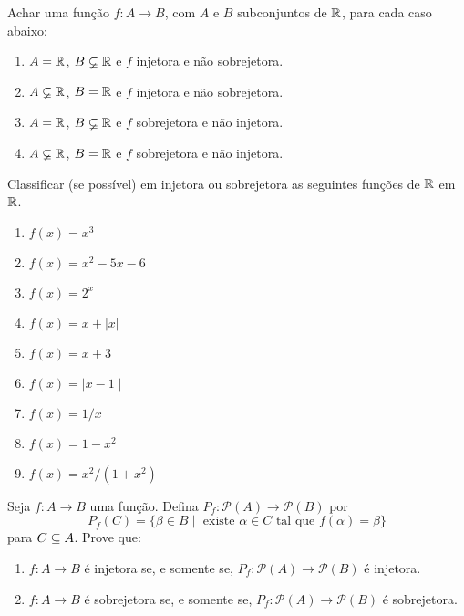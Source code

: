 \documentclass[12pt]{exam}
\begin{document}
\vspace{.3cm}

\questao{} Achar uma função $f : A \to B$, com $A$ e $B$ subconjuntos de $\mathbb{R}$, para cada caso abaixo:
\begin{enumerate}[label={\alph*})]
    \item $A = \mathbb{R}$, $B \varsubsetneq \mathbb{R}$ e $f$ injetora e não sobrejetora.

    \item $A \varsubsetneq \mathbb{R}$, $B = \mathbb{R}$ e $f$ injetora e não sobrejetora.

    \item $A = \mathbb{R}$, $B \varsubsetneq \mathbb{R}$ e $f$ sobrejetora e não injetora.

    \item $A \varsubsetneq \mathbb{R}$, $B = \mathbb{R}$ e $f$ sobrejetora e não injetora.
\end{enumerate}

\vspace{.3cm}

\questao{} Classificar (se possível) em injetora ou sobrejetora as seguintes funç{õ}es de $\mathbb{R}$ em $\mathbb{R}$.

\begin{multicols}{2}
    \begin{enumerate}[label={\alph*})]
        \item $f(x) = x^3$

        \item $f(x) = x^2 - 5x - 6$

        \item $f(x) = 2^x$

        \item $f(x) = x + | x |$

        \item $f(x) = x + 3$

        \item $f(x) = \mid x - 1\mid$

        \item $f(x) = 1/x$

        \item $f(x) = 1 - x^2$

        \item $f(x) = x^2/(1 + x^2)$
    \end{enumerate}
\end{multicols}

\vspace{.3cm}

\questao{} Seja $f : A \to B$ uma função. Defina $P_f : \mathcal{P}(A) \to \mathcal{P}(B)$ por
\[
P_f(C) = \{\beta \in B \mid \mbox{ existe } \alpha \in C \mbox{ tal que } f(\alpha) = \beta\}
\]
para $C \subseteq A$. Prove que:
\begin{enumerate}[label={\roman*})]

    \item $f : A \to B$ é injetora se, e somente se, $P_f : \mathcal{P}(A) \to \mathcal{P}(B)$ é injetora.

    \item $f : A \to B$ é sobrejetora se, e somente se, $P_f : \mathcal{P}(A) \to \mathcal{P}(B)$ é sobrejetora.
\end{enumerate}
\end{document}

